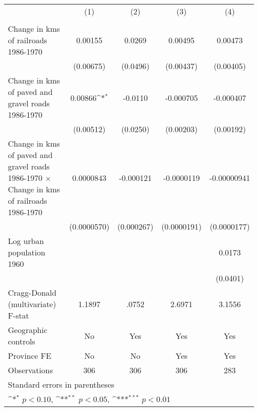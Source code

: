 {
\def\sym#1{\ifmmode^{#1}\else\(^{#1}\)\fi}
\begin{tabular}{l*{4}{c}}
\hline\hline
                &\multicolumn{1}{c}{(1)}&\multicolumn{1}{c}{(2)}&\multicolumn{1}{c}{(3)}&\multicolumn{1}{c}{(4)}\\
                &\multicolumn{1}{c}{}&\multicolumn{1}{c}{}&\multicolumn{1}{c}{}&\multicolumn{1}{c}{}\\
\hline
Change in kms of railroads 1986-1970&  0.00155         &   0.0269         &  0.00495         &  0.00473         \\
                &(0.00675)         & (0.0496)         &(0.00437)         &(0.00405)         \\
[1em]
Change in kms of paved and gravel roads 1986-1970&  0.00866\sym{*}  &  -0.0110         &-0.000705         &-0.000407         \\
                &(0.00512)         & (0.0250)         &(0.00203)         &(0.00192)         \\
[1em]
Change in kms of paved and gravel roads 1986-1970 $\times$ Change in kms of railroads 1986-1970&0.0000843         &-0.000121         &-0.0000119         &-0.00000941         \\
                &(0.0000570)         &(0.000267)         &(0.0000191)         &(0.0000177)         \\
[1em]
Log urban population 1960&                  &                  &                  &   0.0173         \\
                &                  &                  &                  & (0.0401)         \\
\hline
Cragg-Donald (multivariate) F-stat&   1.1897         &    .0752         &   2.6971         &   3.1556         \\
Geographic controls&       No         &      Yes         &      Yes         &      Yes         \\
Province FE     &       No         &       No         &      Yes         &      Yes         \\
Observations    &      306         &      306         &      306         &      283         \\
\hline\hline
\multicolumn{5}{l}{\footnotesize Standard errors in parentheses}\\
\multicolumn{5}{l}{\footnotesize \sym{*} \(p<0.10\), \sym{**} \(p<0.05\), \sym{***} \(p<0.01\)}\\
\end{tabular}
}
